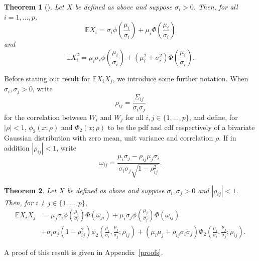 \documentclass{article}
\begin{document}
\newtheorem{theorem}{Theorem}
\begin{theorem}[\textbf{\cite[Equation (C.9)]{frey1999variational}}]
    Let $X$ be defined as above and suppose $\sigma_i>0$. Then, for all $i=1,\ldots,p$, 
    \begin{equation}\label{EXi_eqn}\mathbb{E} X_i = \sigma_i \phi \left( \frac{\mu_i}{\sigma_i} \right)+\mu_i \Phi \left( \frac{\mu_i}{\sigma_i} \right)\end{equation}
    and
    \begin{equation}\label{EXi2_eqn}\mathbb{E}X_i^2 =\mu_i \sigma_i \phi \left( \frac{\mu_i}{\sigma_i} \right)+(\mu_i^2+\sigma_i^2) \Phi \left( \frac{\mu_i}{\sigma_i} \right).\end{equation}
\label{thrm:xi}
\end{theorem}

Before stating our result for $\mathbb{E} X_i X_j$, we introduce some further notation. When $\sigma_i,\sigma_j>0$, write $$\rho_{ij} = \frac{\Sigma_{ij}}{\sigma_i \sigma_j}$$ 
for the correlation between $W_i$ and $W_j$ for all $i,j \in \{1,\hdots,p\}$, and define, for $|\rho|<1$, $\phi_2 (x; \rho)$ and $\Phi_2 (x; \rho)$ to be the pdf and cdf respectively of a bivariate Gaussian distribution with zero mean, unit variance and correlation $\rho$. If in addition $|\rho_{ij}|<1$, write 
\begin{equation}\label{omega_def}
\omega_{ij} = \frac{\mu_i\sigma_j - \rho_{ij} \mu_j\sigma_i}{\sigma_i\sigma_j\sqrt{1 - \rho_{ij}^2}}.
\end{equation}

\begin{theorem}
    Let $X$ be defined as above and suppose $\sigma_i,\sigma_j>0$ and $|\rho_{ij}|<1$. Then, for $i \neq j \in \{1,\ldots,p\}$,
    \begin{align}
    \mathbb{E} X_i X_j &= \mu_j \sigma_i \phi \left( \frac{\mu_i}{\sigma_i} \right) \Phi ( \omega_{ji} ) + \mu_i \sigma_j \phi \left( \frac{\mu_j}{\sigma_j} \right) \Phi ( \omega_{ij} )\nonumber\\
    &+ \sigma_i\sigma_j(1-\rho_{ij}^2) \phi_2 \left( \frac{\mu_i}{\sigma_i}, \frac{\mu_j}{\sigma_j}; \rho_{ij} \right)+ ( \mu_i \mu_j + \rho_{ij} \sigma_i \sigma_j ) \Phi_2 \left( \frac{\mu_i}{\sigma_i}, \frac{\mu_j}{\sigma_j}; \rho_{ij} \right).\label{EXiXj}
    \end{align}     
 
\label{thrm:xixj}
\end{theorem}

A proof of this result is given in Appendix~\ref{proofs}.
\end{document}
